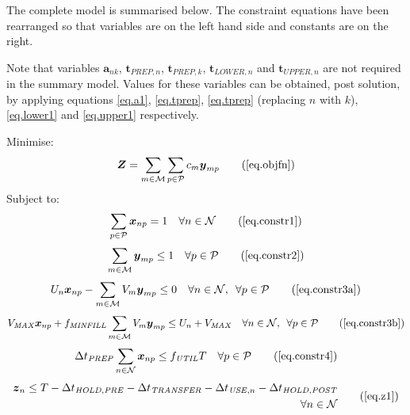 The complete model is summarised below.
The constraint equations have been rearranged so that variables are on the left
hand side and constants are on the right.

Note that variables $\boldsymbol{a}_{nk}$, $\boldsymbol{t}_{\mathit{PREP},n}$,
$\boldsymbol{t}_{\mathit{PREP},k}$, $\boldsymbol{t}_{\mathit{LOWER},n}$ and
$\boldsymbol{t}_{\mathit{UPPER},n}$ are not required in the summary model.
Values for these variables can be obtained, post solution, by applying
equations \ref{eq.a1}, \ref{eq.tprep}, \ref{eq.tprep} (replacing $n$ with $k$),
\ref{eq.lower1} and \ref{eq.upper1} respectively.

Minimise:
\begin{equation}
    \boldsymbol{Z} = \sum_{m \in \mathcal{M}} \sum_{p \in \mathcal{P}} c_m
    \boldsymbol{y}_{mp}
    \tag{\ref{eq.objfn}}
\end{equation}
Subject to:
\begin{equation}
    \sum_{p \in \mathcal{P}} \boldsymbol{x}_{np} = 1 \quad \forall n \in 
    \mathcal{N}
    \tag{\ref{eq.constr1}}
\end{equation}
\begin{equation}
    \sum_{m \in \mathcal{M}} \boldsymbol{y}_{mp} \le 1 \quad \forall p \in 
    \mathcal{P}
    \tag{\ref{eq.constr2}}
\end{equation}
\begin{equation}
    U_{n} \boldsymbol{x}_{np} - \sum_{m \in \mathcal{M}} V_{m} 
    \boldsymbol{y}_{mp} \le 0 \quad \forall n \in \mathcal{N}, \enspace 
    \forall p \in \mathcal{P}
    \tag{\ref{eq.constr3a}}
\end{equation}
\begin{equation}
    V_{\mathit{MAX}} \boldsymbol{x}_{np} + f_{\mathit{MINFILL}} 
    \sum_{m \in \mathcal{M}} V_{m} \boldsymbol{y}_{mp} \le U_{n}
    + V_{\mathit{MAX}} \quad \forall n \in \mathcal{N}, \enspace \forall p \in
    \mathcal{P}
    \tag{\ref{eq.constr3b}}
\end{equation}
\begin{equation}
    \Delta t_{\mathit{PREP}} \sum_{n \in \mathcal{N}} \boldsymbol{x}_{np} \le
    f_{\mathit{UTIL}} T \quad \forall p \in \mathcal{P}
    \tag{\ref{eq.constr4}}
\end{equation}
\begin{equation}
    \begin{aligned}
        \boldsymbol{z}_{n} \le T - \Delta t_{\mathit{HOLD,PRE}}
        - \Delta t_{\mathit{TRANSFER}} - \Delta t_{\mathit{USE},n}
        - \Delta t_{\mathit{HOLD,POST}}\\
        \quad \forall n \in \mathcal{N}
    \end{aligned}
    \tag{\ref{eq.z1}}
\end{equation}
